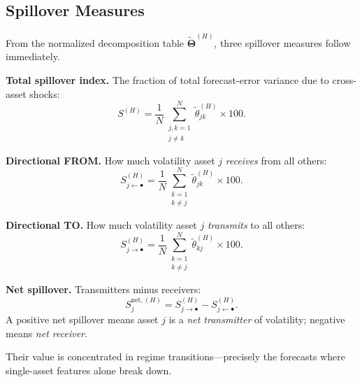 \subsection{Spillover Measures}

From the normalized decomposition table $\widetilde{\bm{\Theta}}^{(H)}$, three
spillover measures follow immediately.

\begin{keyidea}
\textbf{Total spillover index.}  The fraction of total forecast-error variance due
to cross-asset shocks:
\begin{equation}\label{eq:total-spillover}
  S^{(H)} = \frac{1}{N} \sum_{\substack{j,k=1 \\ j \neq k}}^{N}
    \widetilde{\theta}_{jk}^{(H)} \times 100.
\end{equation}

\textbf{Directional FROM.}  How much volatility asset $j$ \emph{receives} from all
others:
\begin{equation}\label{eq:from-spillover}
  S_{j \leftarrow \bullet}^{(H)}
  = \frac{1}{N} \sum_{\substack{k=1 \\ k \neq j}}^{N}
    \widetilde{\theta}_{jk}^{(H)} \times 100.
\end{equation}

\textbf{Directional TO.}  How much volatility asset $j$ \emph{transmits} to all
others:
\begin{equation}\label{eq:to-spillover}
  S_{j \rightarrow \bullet}^{(H)}
  = \frac{1}{N} \sum_{\substack{k=1 \\ k \neq j}}^{N}
    \widetilde{\theta}_{kj}^{(H)} \times 100.
\end{equation}

\textbf{Net spillover.}  Transmitters minus receivers:
\begin{equation}\label{eq:net-spillover}
  S_j^{\text{net},(H)}
  = S_{j \rightarrow \bullet}^{(H)} - S_{j \leftarrow \bullet}^{(H)}.
\end{equation}
A positive net spillover means asset $j$ is a \emph{net transmitter} of volatility;
negative means \emph{net receiver}.
\end{keyidea}

\begin{projectconnection}
Their
value is concentrated in regime transitions---precisely the forecasts where
single-asset features alone break down.
\end{projectconnection}

